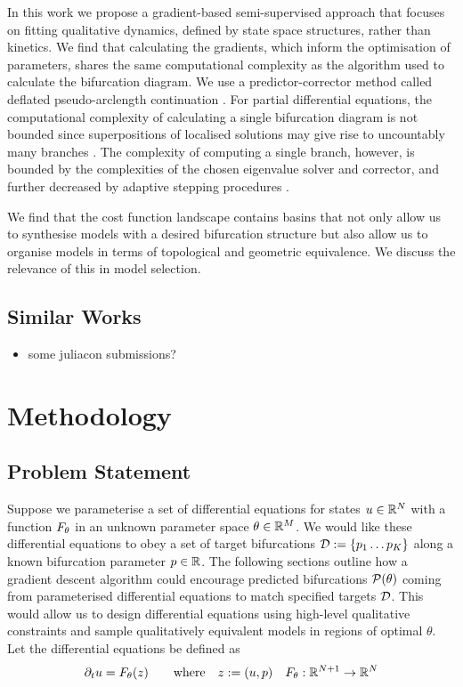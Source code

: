 In this work we propose a gradient-based semi-supervised approach that focuses on fitting qualitative dynamics, defined by state space structures, rather than kinetics. We find that calculating the gradients, which inform the optimisation of parameters, shares the same computational complexity as the algorithm used to calculate the bifurcation diagram. We use a predictor-corrector method called deflated pseudo-arclength continuation \cite{Farrell2016TheDiagrams,Veltz2019PseudoArcLengthContinuation.jl}. For partial differential equations, the computational complexity of calculating a single bifurcation diagram is not bounded since superpositions of localised solutions may give rise to uncountably many branches \cite{Avitabile2010ToEquation}. The complexity of computing a single branch, however, is bounded by the complexities of the chosen eigenvalue solver and corrector, and further decreased by adaptive stepping procedures \cite{Aruliah2016AlgorithmContinuation}.

We find that the cost function landscape contains basins that not only allow us to synthesise models with a desired bifurcation structure but also allow us to organise models in terms of topological and geometric equivalence. We discuss the relevance of this in model selection.

\subsection{Similar Works}

\begin{itemize}
    \item some juliacon submissions?
\end{itemize}
\clearpage

\section{Methodology}

\subsection{Problem Statement}
Suppose we parameterise a set of differential equations for states $u\in\mathbb{R}^N$ with a function $F_{\theta}$ in an unknown parameter space $\theta\in\mathbb{R}^M$. We would like these differential equations to obey a set of target bifurcations $\mathcal{D}:=\{p_1\dots p_K\}$ along a known bifurcation parameter $p\in\mathbb{R}$. The following sections outline how a gradient descent algorithm could encourage predicted bifurcations $\mathcal{P}(\theta)$ coming from parameterised differential equations to match specified targets $\mathcal{D}$. This would allow us to design differential equations using high-level qualitative constraints and sample qualitatively equivalent models in regions of optimal $\theta$. Let the differential equations be defined as
\begin{align}
	\partial_t u=F_{\theta}(z)
	\qquad\mathrm{where}\quad z:=(u,p)\quad
	F_{\theta} : \mathbb{R}^{N+1}\rightarrow\mathbb{R}^N
	\label{eq:model}
\end{align}

